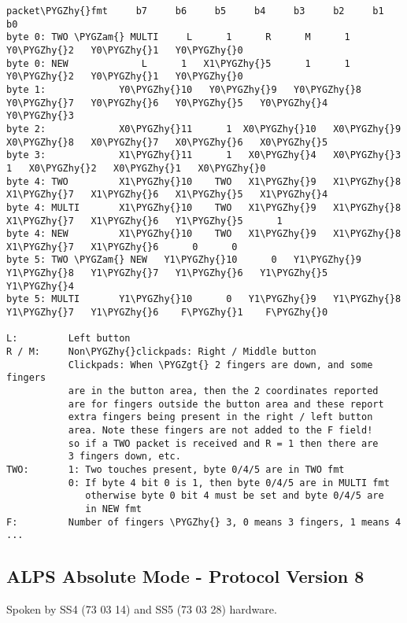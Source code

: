 \documentclass[a4paper,8pt,english]{sphinxmanual}
\def\PYGZam{\char`\&}
\def\PYGZgt{\char`\>}
\def\PYGZhy{\char`\-}
\begin{document}
\begin{Verbatim}[commandchars=\\\{\}]
        packet\PYGZhy{}fmt     b7     b6     b5     b4     b3     b2     b1     b0
byte 0: TWO \PYGZam{} MULTI     L      1      R      M      1   Y0\PYGZhy{}2   Y0\PYGZhy{}1   Y0\PYGZhy{}0
byte 0: NEW             L      1   X1\PYGZhy{}5      1      1   Y0\PYGZhy{}2   Y0\PYGZhy{}1   Y0\PYGZhy{}0
byte 1:             Y0\PYGZhy{}10   Y0\PYGZhy{}9   Y0\PYGZhy{}8   Y0\PYGZhy{}7   Y0\PYGZhy{}6   Y0\PYGZhy{}5   Y0\PYGZhy{}4   Y0\PYGZhy{}3
byte 2:             X0\PYGZhy{}11      1  X0\PYGZhy{}10   X0\PYGZhy{}9   X0\PYGZhy{}8   X0\PYGZhy{}7   X0\PYGZhy{}6   X0\PYGZhy{}5
byte 3:             X1\PYGZhy{}11      1   X0\PYGZhy{}4   X0\PYGZhy{}3      1   X0\PYGZhy{}2   X0\PYGZhy{}1   X0\PYGZhy{}0
byte 4: TWO         X1\PYGZhy{}10    TWO   X1\PYGZhy{}9   X1\PYGZhy{}8   X1\PYGZhy{}7   X1\PYGZhy{}6   X1\PYGZhy{}5   X1\PYGZhy{}4
byte 4: MULTI       X1\PYGZhy{}10    TWO   X1\PYGZhy{}9   X1\PYGZhy{}8   X1\PYGZhy{}7   X1\PYGZhy{}6   Y1\PYGZhy{}5      1
byte 4: NEW         X1\PYGZhy{}10    TWO   X1\PYGZhy{}9   X1\PYGZhy{}8   X1\PYGZhy{}7   X1\PYGZhy{}6      0      0
byte 5: TWO \PYGZam{} NEW   Y1\PYGZhy{}10      0   Y1\PYGZhy{}9   Y1\PYGZhy{}8   Y1\PYGZhy{}7   Y1\PYGZhy{}6   Y1\PYGZhy{}5   Y1\PYGZhy{}4
byte 5: MULTI       Y1\PYGZhy{}10      0   Y1\PYGZhy{}9   Y1\PYGZhy{}8   Y1\PYGZhy{}7   Y1\PYGZhy{}6    F\PYGZhy{}1    F\PYGZhy{}0

L:         Left button
R / M:     Non\PYGZhy{}clickpads: Right / Middle button
           Clickpads: When \PYGZgt{} 2 fingers are down, and some fingers
           are in the button area, then the 2 coordinates reported
           are for fingers outside the button area and these report
           extra fingers being present in the right / left button
           area. Note these fingers are not added to the F field!
           so if a TWO packet is received and R = 1 then there are
           3 fingers down, etc.
TWO:       1: Two touches present, byte 0/4/5 are in TWO fmt
           0: If byte 4 bit 0 is 1, then byte 0/4/5 are in MULTI fmt
              otherwise byte 0 bit 4 must be set and byte 0/4/5 are
              in NEW fmt
F:         Number of fingers \PYGZhy{} 3, 0 means 3 fingers, 1 means 4 ...
\end{Verbatim}


\subsection{ALPS Absolute Mode - Protocol Version 8}
\label{input/devices/alps:alps-absolute-mode-protocol-version-8}
Spoken by SS4 (73 03 14) and SS5 (73 03 28) hardware.
\end{document}
